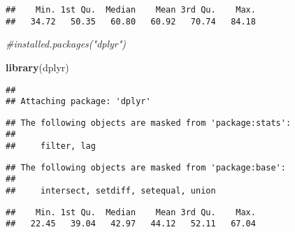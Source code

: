 \documentclass[
]{article}
\newenvironment{Shaded}{\begin{snugshade}}{\end{snugshade}}
\newcommand{\CommentTok}[1]{\textcolor[rgb]{0.56,0.35,0.01}{\textit{#1}}}
\newcommand{\DecValTok}[1]{\textcolor[rgb]{0.00,0.00,0.81}{#1}}
\newcommand{\FunctionTok}[1]{\textcolor[rgb]{0.13,0.29,0.53}{\textbf{#1}}}
\newcommand{\NormalTok}[1]{#1}
\newcommand{\OtherTok}[1]{\textcolor[rgb]{0.56,0.35,0.01}{#1}}
\newcommand{\SpecialCharTok}[1]{\textcolor[rgb]{0.81,0.36,0.00}{\textbf{#1}}}
\begin{document}
\begin{Shaded}
\end{Shaded}

\begin{verbatim}
##    Min. 1st Qu.  Median    Mean 3rd Qu.    Max. 
##   34.72   50.35   60.80   60.92   70.74   84.18
\end{verbatim}

\begin{Shaded}
\begin{Highlighting}[]
\CommentTok{\#installed.packages("dplyr")}
\end{Highlighting}
\end{Shaded}

\begin{Shaded}
\begin{Highlighting}[]
\FunctionTok{library}\NormalTok{(dplyr)}
\end{Highlighting}
\end{Shaded}

\begin{verbatim}
## 
## Attaching package: 'dplyr'
\end{verbatim}

\begin{verbatim}
## The following objects are masked from 'package:stats':
## 
##     filter, lag
\end{verbatim}

\begin{verbatim}
## The following objects are masked from 'package:base':
## 
##     intersect, setdiff, setequal, union
\end{verbatim}

\begin{Shaded}
\end{Shaded}

\begin{verbatim}
##    Min. 1st Qu.  Median    Mean 3rd Qu.    Max. 
##   22.45   39.04   42.97   44.12   52.11   67.04
\end{verbatim}
\end{document}
